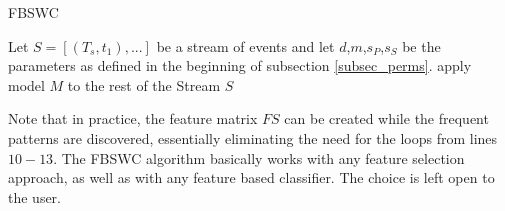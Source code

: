 \begin{algorithm}[H]
  \caption{FBSWC
    \label{alg_FBSWC}}
  \begin{algorithmic}[1]
    \Statex
    \Require Let $S=[(T_s,t_1),...]$ be a stream of events and let $d$,$m$,$s_P$,$s_S$ be the parameters as defined in the beginning of subsection \ref{subsec_perms}.
       
      	\EndFor
      	 
      \EndFor
      \State apply model $M$ to the rest of the Stream $S$
    \EndFunction
  \end{algorithmic}
\end{algorithm}

Note that in practice, the feature matrix $FS$ can be created while the frequent patterns are discovered, essentially eliminating the need for the loops from lines $10-13$. The FBSWC algorithm basically works with any feature selection approach, as well as with any feature based classifier. The choice is left open to the user.

